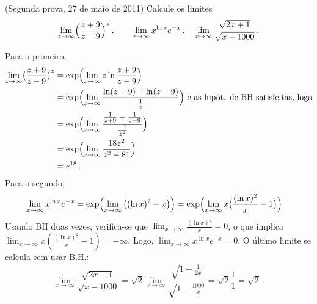 \begin{exo} (Segunda prova, 27 de maio de 2011)
 Calcule os limites 
$$\lim_{z\to \infty}\Bigl(\frac{z+9}{z-9}\Bigr)^z\,,\quad\quad
\lim_{x\to \infty}x^{\ln x}e^{-x}\,,\quad
\lim_{x\to \infty}\frac{\sqrt{2x+1}}{\sqrt{x-1000}}\,.
$$
\begin{sol} Para o primeiro,
\begin{align*}
 \lim_{z\to \infty}\bigl(\frac{z+9}{z-9}\bigr)^z&=\exp \Bigl(\lim_{z\to \infty}
z \ln \frac{z+9}{z-9}\Bigr)\\
&=\exp \Bigl(\lim_{z\to \infty} \frac{\ln (z+9)-\ln
(z-9)}{\frac{1}{z}}\Bigr)\text{ e as hipót. de BH satisfeitas, logo}\\
&=\exp \Bigl(\lim_{z\to \infty}
\frac{\frac{1}{z+9}-\frac{1}{z-9}}{\frac{-1}{z^2}}\Bigr)\\
&=\exp \Bigl(\lim_{z\to \infty} \frac{18 z^2}{z^2-81}\Bigr)\\
&=e^{18}\,. 
\end{align*}
Para o segundo,
\begin{align*}
 \lim_{x\to \infty}x^{\ln x}e^{-x}&=\exp \Bigl(\lim_{x\to \infty} \big((\ln
x)^2-x \big)\Bigr)
=\exp \Bigl(\lim_{x\to \infty} x\big(\frac{(\ln x)^2}{x}-1
\big)\Bigr)
\end{align*}
Usando BH duas vezes, verifica-se que $\lim_{x\to \infty}\frac{(\ln
x)^2}{x}=0$, 
o que implica $\lim_{x\to \infty} x(\frac{(\ln
x)^2}{x}-1)=-\infty$.
Logo, $\lim_{x\to \infty}x^{\ln x}e^{-x}=0$.
O último limite se calcula sem usar B.H.:
$$\lim_{x\to \infty}\frac{\sqrt{2x+1}}{\sqrt{x-1000}}=\sqrt{2}\lim_{x\to
\infty}\frac{\sqrt{1+\frac{1}{2x}}}{\sqrt{1-\frac{1000}{x}}}=\sqrt{2}\frac{1}{1}
=\sqrt{2}\,.$$
\end{sol}
\end{exo}




